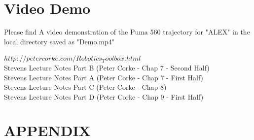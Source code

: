 \documentclass[a4paper, 10pt]{article}
\begin{document}


\section{Video Demo}

Please find A video demonstration of the Puma 560 trajectory for "ALEX" in the local directory saved as "Demo.mp4"



\nocite{*}


$http://petercorke.com/Robotics_Toolbox.html$
\\
Stevens Lecture Notes Part B (Peter Corke - Chap 7 - Second Half)
\\
Stevens Lecture Notes Part A (Peter Corke - Chap 7 - First Half)
\\
Stevens Lecture Notes Part C (Peter Corke - Chap 8)
\\
Stevens Lecture Notes Part D (Peter Corke - Chap 9 - First Half)


\section*{APPENDIX}

\begin{lstlisting}[language = C++]



\end{lstlisting}
\end{document}
